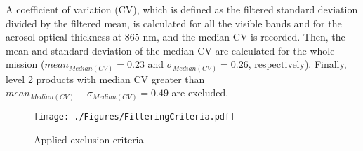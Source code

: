 \documentclass[onecolumn,3p,letterpaper,11pt]{elsarticle}
\begin{document}
A coefficient of variation (CV), which is defined as the filtered standard deviation divided by the filtered mean, is calculated for all the visible bands and for the aerosol optical thickness at 865 nm, and the median CV is recorded. Then, the mean and standard deviation of the median CV are calculated for the whole mission ($mean_{Median(CV)}=0.23$ and $\sigma_{Median(CV)}=0.26$, respectively). Finally, level 2 products with median CV greater than $mean_{Median(CV)}+\sigma_{Median(CV)}=0.49$ are excluded.

\begin{figure}[ht]
  \centering
    \texttt{[image: ./Figures/FilteringCriteria.pdf]}
  \caption{Applied exclusion criteria}\label{fig:FilteringCriteria}
\end{figure}







\end{document}

